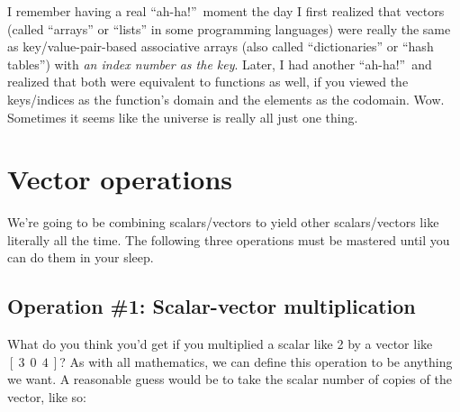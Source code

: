 
I remember having a real ``ah-ha!''~moment the day I first realized that
vectors (called ``arrays'' or ``lists'' in some programming languages) were
really the same as key/value-pair-based associative arrays (also called
``dictionaries'' or ``hash tables'') with \textit{an index number as the key}.
Later, I had another ``ah-ha!''~and realized that both were equivalent to
functions as well, if you viewed the keys/indices as the function's domain and
the elements as the codomain. Wow. Sometimes it seems like the universe is
really all just one thing.

%
%
%
%
%
%
%
%
%
%
%
%
%
%
%
%
%
%
%
%
%
%
%
%
%
%
%
%
%
%
%
%
%
%
%
%
%
%
%
%
%


\section{Vector operations}
\label{vectorOps}

We're going to be combining scalars/vectors to yield other scalars/vectors like
literally all the time. The following three operations must be mastered until
you can do them in your sleep.

\subsection{Operation \#1: Scalar-vector multiplication}

What do you think you'd get if you multiplied a scalar like 2 by a vector like
$[\ 3\ \ 0\ \ 4\ ]$? As with all mathematics, we can define this operation to
be anything we want. A reasonable guess would be to take the scalar number of
copies of the vector, like so:

